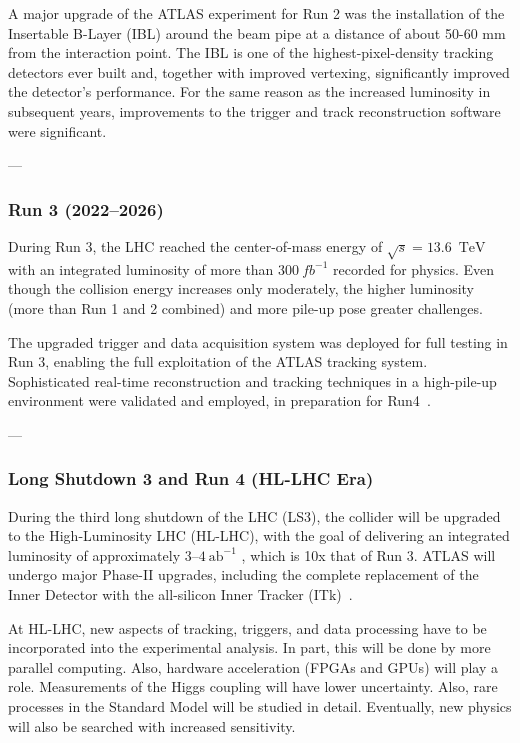 A major upgrade of the ATLAS experiment for Run 2 was the installation of the Insertable B-Layer (IBL) around the beam pipe at a distance of about 50-60 mm from the interaction point. The IBL is one of the highest-pixel-density tracking detectors ever built and, together with improved vertexing, significantly improved the detector's performance. For the same reason as the increased luminosity in subsequent years, improvements to the trigger and track reconstruction software were significant. 

---

\subsubsection{Run 3 (2022--2026)}

During Run 3, the LHC reached the center-of-mass energy of $\sqrt{s} = 13.6\,\text{ TeV}$ with an integrated luminosity of more than $300~fb^{-1}$ recorded for physics. Even though the collision energy increases only moderately, the higher luminosity (more than Run 1 and 2 combined) and more pile-up pose greater challenges.

The upgraded trigger and data acquisition system was deployed for full testing in Run 3, enabling the full exploitation of the ATLAS tracking system. Sophisticated real-time reconstruction and tracking techniques in a high-pile-up environment were validated and employed, in preparation for Run4~\cite{ATLASRun3Overview}.

---

\subsubsection{Long Shutdown 3 and Run 4 (HL-LHC Era)}

During the third long shutdown of the LHC (LS3), the collider will be upgraded to the High-Luminosity LHC (HL-LHC), with the goal of delivering an integrated luminosity of approximately $3$--$4~\mathrm{ab}^{-1}$ \cite{HLLHCDesign}, which is 10x that of Run 3. ATLAS will undergo major Phase-II upgrades, including the complete replacement of the Inner Detector with the all-silicon Inner Tracker (ITk)~\cite{ATLASITkTDR}.

At HL-LHC, new aspects of tracking, triggers, and data processing have to be incorporated into the experimental analysis. In part, this will be done by more parallel computing. Also, hardware acceleration (FPGAs and GPUs) will play a role. Measurements of the Higgs coupling will have lower uncertainty. Also, rare processes in the Standard Model will be studied in detail. Eventually, new physics will also be searched with increased sensitivity. 


